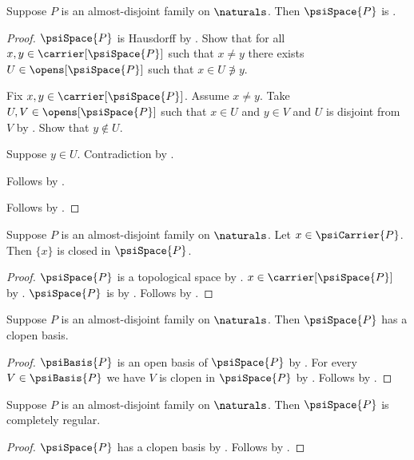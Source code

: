 \begin{corollary}\label{psi_space_is_teeone}
    Suppose $P$ is an almost-disjoint family on $\naturals$.
    Then $\psiSpace{P}$ is \teeone.
\end{corollary}
\begin{proof}
    $\psiSpace{P}$ is Hausdorff by .
    Show that for all $x,y\in\carrier[\psiSpace{P}]$ such that
        $x\neq y$ there exists $U\in\opens[\psiSpace{P}]$ such that
        $x\in U\not\ni y$.
    \begin{subproof}
        Fix $x,y\in\carrier[\psiSpace{P}]$.
        Assume $x\neq y$.
        Take $U,V\in\opens[\psiSpace{P}]$ such that
            $x\in U$ and $y\in V$ and $U$ is disjoint from $V$
            by .
        Show that $y\notin U$.
        \begin{subproof}
            Suppose $y\in U$.
            Contradiction by .
        \end{subproof}
        Follows by \auto.
    \end{subproof}
    Follows by .
\end{proof}

\begin{corollary}\label{psi_singletons_closed}
    Suppose $P$ is an almost-disjoint family on $\naturals$.
    Let $x\in\psiCarrier{P}$.
    Then $\{x\}$ is closed in $\psiSpace{P}$.
\end{corollary}
\begin{proof}
    $\psiSpace{P}$ is a topological space
        by .
    $x\in\carrier[\psiSpace{P}]$ by .
    $\psiSpace{P}$ is \teeone by .
    Follows by .
\end{proof}

\begin{theorem}\label{psi_space_has_clopen_basis}
    Suppose $P$ is an almost-disjoint family on $\naturals$.
    Then $\psiSpace{P}$ has a clopen basis.
\end{theorem}
\begin{proof}
    $\psiBasis{P}$ is an open basis of $\psiSpace{P}$
        by .
    For every $V\in\psiBasis{P}$ we have $V$ is clopen in
        $\psiSpace{P}$ by .
    Follows by .
\end{proof}

\begin{theorem}\label{psi_space_is_completely_regular}
    Suppose $P$ is an almost-disjoint family on $\naturals$.
    Then $\psiSpace{P}$ is completely regular.
\end{theorem}
\begin{proof}
    $\psiSpace{P}$ has a clopen basis
        by .
    Follows by .
\end{proof}

